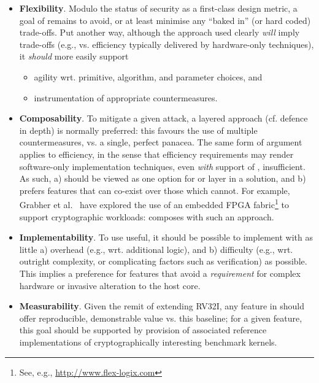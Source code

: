 \begin{itemize}
\begin{itemize}
      \item {\bf      Flexibility}. 
            Modulo the status of security as a first-class design metric, a
            goal of \XCID remains to avoid, or at least minimise any ``baked 
            in'' (or hard coded) trade-offs.  Put another way, although the 
            approach used clearly {\em will} imply trade-offs 
            (e.g., vs. efficiency typically delivered by hardware-only techniques), 
            it {\em should} more easily support

            \begin{itemize}
            \item agility wrt. primitive, algorithm, and parameter choices,
                  and
            \item instrumentation of appropriate countermeasures.
            \end{itemize}

      \item {\bf    Composability}.
            To mitigate a given attack, a layered approach (cf. defence in 
            depth) is normally preferred: this favours the use of multiple
            countermeasures, vs. a single, perfect panacea.  The same form
            of argument applies to efficiency, in the sense that efficiency 
            requirements may render software-only implementation techniques,
            even {\em with} support of \XCID, insufficient.
            As such, \XCID
            a) should be viewed as one option for or layer in a solution,
               and
            b) prefers features that can co-exist over those which cannot.
            For example, 
            Grabher et al.~\cite{SCARV:GGHJPTW:11} have explored the use of 
            an embedded FPGA fabric\footnote{
            See, e.g., \url{http://www.flex-logix.com}
            } to support cryptographic workloads: \XCID composes with such 
            an approach.
      \item {\bf Implementability}. 
            To use useful, it should be possible to implement \XCID with as
            little
            a) overhead   (e.g., wrt. additional logic),
               and
            b) difficulty (e.g., wrt. outright complexity, or complicating factors such as verification)
            as possible.  This implies a preference for features that avoid 
            a {\em requirement} for complex hardware or invasive alteration 
            to the host core.

      \item {\bf    Measurability}.
            Given the remit of extending RV32I, any feature in \XCID should 
            offer reproducible, demonstrable value vs. this baseline; for 
            a given feature, this goal should be supported by provision of 
            associated reference implementations of cryptographically 
            interesting benchmark kernels.


\end{itemize}
\end{itemize}
